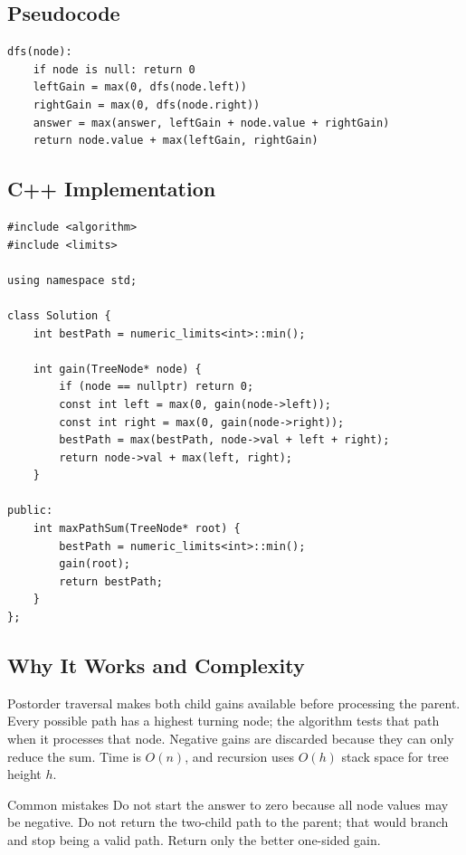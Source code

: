 \subsection{Pseudocode}
\begin{lstlisting}[style=pseudocode]
dfs(node):
    if node is null: return 0
    leftGain = max(0, dfs(node.left))
    rightGain = max(0, dfs(node.right))
    answer = max(answer, leftGain + node.value + rightGain)
    return node.value + max(leftGain, rightGain)
\end{lstlisting}

\subsection{C++ Implementation}
\begin{lstlisting}[style=compactcode,caption={Complete C++ solution: Binary Tree Maximum Path Sum}]
#include <algorithm>
#include <limits>

using namespace std;

class Solution {
    int bestPath = numeric_limits<int>::min();

    int gain(TreeNode* node) {
        if (node == nullptr) return 0;
        const int left = max(0, gain(node->left));
        const int right = max(0, gain(node->right));
        bestPath = max(bestPath, node->val + left + right);
        return node->val + max(left, right);
    }

public:
    int maxPathSum(TreeNode* root) {
        bestPath = numeric_limits<int>::min();
        gain(root);
        return bestPath;
    }
};
\end{lstlisting}

\subsection{Why It Works and Complexity}
Postorder traversal makes both child gains available before processing the
parent. Every possible path has a highest turning node; the algorithm tests
that path when it processes that node. Negative gains are discarded because
they can only reduce the sum. Time is \(O(n)\), and recursion uses \(O(h)\)
stack space for tree height \(h\).

\begin{revisionbox}{Common mistakes}
Do not start the answer to zero because all node values may be negative.
Do not return the two-child path to the parent; that would branch and stop
being a valid path. Return only the better one-sided gain.
\end{revisionbox}

